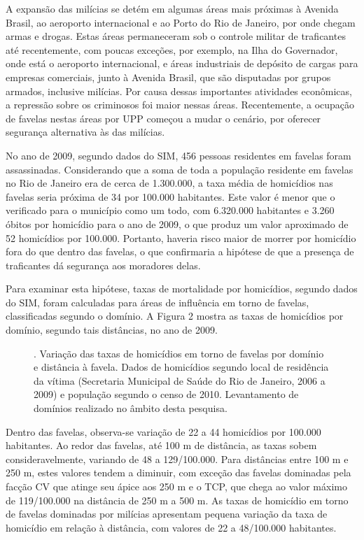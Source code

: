 \documentclass{article}
\begin{document}
A expansão das milícias se detém em algumas áreas mais próximas à Avenida
Brasil, ao aeroporto internacional e ao Porto do Rio de Janeiro, por onde chegam
armas e drogas. Estas áreas permaneceram sob o controle militar de traficantes
até recentemente, com poucas exceções, por exemplo, na Ilha do Governador, onde
está o aeroporto internacional, e áreas industriais de depósito de cargas para
empresas comerciais, junto à Avenida Brasil, que são disputadas por grupos
armados, inclusive milícias. Por causa dessas importantes atividades econômicas,
a repressão sobre os criminosos foi maior nessas áreas. Recentemente, a ocupação
de favelas nestas áreas por UPP começou a mudar o cenário, por oferecer
segurança alternativa às das milícias.

No ano de 2009, segundo dados do SIM, 456 pessoas residentes em favelas foram
assassinadas. Considerando que a soma de toda a população residente em favelas
no Rio de Janeiro era de cerca de 1.300.000, a taxa média de homicídios nas
favelas seria próxima de 34 por 100.000 habitantes. Este valor é menor que o
verificado para o município como um todo, com 6.320.000 habitantes e 3.260
óbitos por homicídio para o ano de 2009, o que produz um valor aproximado de 52
homicídios por 100.000. Portanto, haveria risco maior de morrer por homicídio
fora do que dentro das favelas, o que confirmaria a hipótese de que a presença
de traficantes dá segurança aos moradores delas.

Para examinar esta hipótese, taxas de mortalidade por homicídios, segundo dados
do SIM, foram calculadas para áreas de influência em torno de favelas,
classificadas segundo o domínio. A Figura 2 mostra as taxas de homicídios por
domínio, segundo tais distâncias, no ano de 2009.

\begin{figure}
\caption{. Variação das taxas de homicídios em torno de favelas por domínio e
distância à favela. Dados de homicídios segundo local de residência da vítima
(Secretaria Municipal de Saúde do Rio de Janeiro, 2006 a 2009) e população
segundo o censo de 2010. Levantamento de domínios realizado no âmbito desta
pesquisa.}
\end{figure}

Dentro das favelas, observa-se variação de 22 a 44 homicídios por 100.000
habitantes. Ao redor das favelas, até 100 m de distância, as taxas sobem
consideravelmente, variando de 48 a 129/100.000. Para distâncias entre 100 m e
250 m, estes valores tendem a diminuir, com exceção das favelas dominadas pela
facção CV que atinge seu ápice aos 250 m e o TCP, que chega ao valor máximo de
119/100.000 na distância de 250 m a 500 m. As taxas de homicídio em torno de
favelas dominadas por milícias apresentam pequena variação da taxa de homicídio
em relação à distância, com valores de 22 a 48/100.000 habitantes.
\end{document}
